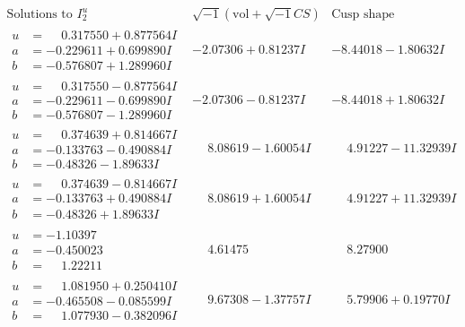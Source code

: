 \documentclass[1p]{elsarticle_modified}
\theoremstyle{definition}
\newcommand{\I}{\sqrt{-1}}
\begin{document}
$$\begin{array}{c|c|c}  
\text{Solutions to }I^u_{2}& \I (\text{vol} + \sqrt{-1}CS) & \text{Cusp shape}\\
 \hline 
\begin{aligned}
u &= \phantom{-}0.317550 + 0.877564 I \\
a &= -0.229611 + 0.699890 I \\
b &= -0.576807 + 1.289960 I\end{aligned}
 & -2.07306 + 0.81237 I & -8.44018 - 1.80632 I \\ \hline\begin{aligned}
u &= \phantom{-}0.317550 - 0.877564 I \\
a &= -0.229611 - 0.699890 I \\
b &= -0.576807 - 1.289960 I\end{aligned}
 & -2.07306 - 0.81237 I & -8.44018 + 1.80632 I \\ \hline\begin{aligned}
u &= \phantom{-}0.374639 + 0.814667 I \\
a &= -0.133763 - 0.490884 I \\
b &= -0.48326 - 1.89633 I\end{aligned}
 & \phantom{-}8.08619 - 1.60054 I & \phantom{-}4.91227 - 11.32939 I \\ \hline\begin{aligned}
u &= \phantom{-}0.374639 - 0.814667 I \\
a &= -0.133763 + 0.490884 I \\
b &= -0.48326 + 1.89633 I\end{aligned}
 & \phantom{-}8.08619 + 1.60054 I & \phantom{-}4.91227 + 11.32939 I \\ \hline\begin{aligned}
u &= -1.10397\phantom{ +0.000000I} \\
a &= -0.450023\phantom{ +0.000000I} \\
b &= \phantom{-}1.22211\phantom{ +0.000000I}\end{aligned}
 & \phantom{-}4.61475\phantom{ +0.000000I} & \phantom{-}8.27900\phantom{ +0.000000I} \\ \hline\begin{aligned}
u &= \phantom{-}1.081950 + 0.250410 I \\
a &= -0.465508 - 0.085599 I \\
b &= \phantom{-}1.077930 - 0.382096 I\end{aligned}
 & \phantom{-}9.67308 - 1.37757 I & \phantom{-}5.79906 + 0.19770 I \\ \hline\begin{aligned}

\end{aligned}
\end{array}$$
\end{document}
